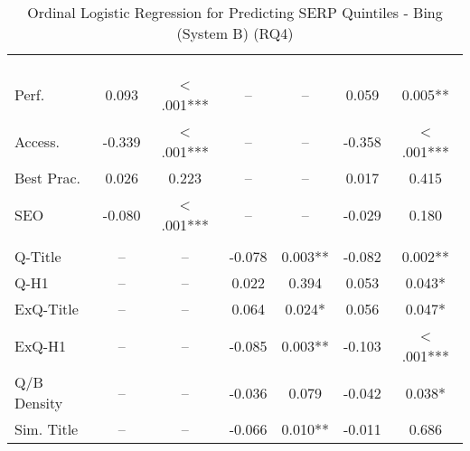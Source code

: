 \begin{table}[htbp!] 
\centering
\caption{Ordinal Logistic Regression for Predicting SERP Quintiles - Bing (System B) (RQ4)}
\label{app:rq4_regression_bing}
\small 
\setlength{\tabcolsep}{3pt}
\renewcommand{\arraystretch}{1}
\begin{threeparttable}
\begin{tabular*}{\textwidth}{l@{\extracolsep{\fill}} S[table-format=-1.3,table-space-text-post={***}] S[table-format=1.3,table-comparator=true,table-space-text-post={***}] S[table-format=-1.3,table-space-text-post={***}] S[table-format=1.3,table-comparator=true,table-space-text-post={***}] S[table-format=-1.3,table-space-text-post={***}] S[table-format=1.3,table-comparator=true,table-space-text-post={***}]}
\toprule
&  &  &  \\
\cmidrule(lr){2-3} \cmidrule(lr){4-5} \cmidrule(lr){6-7}
 & {} & {} & {} & {} & {} & {} \\
\dmidrule
{} & & & & & & \\
Perf. & 0.093 & < .001*** &  &  & 0.059 & 0.005** \\
Access. & -0.339 & < .001*** &  &  & -0.358 & < .001*** \\
Best Prac. & 0.026 & 0.223 &  &  & 0.017 & 0.415 \\
SEO & -0.080 & < .001*** &  &  & -0.029 & 0.180 \\
\midrule
{} & & & & & & \\
Q-Title &  &  & -0.078 & 0.003** & -0.082 & 0.002** \\
Q-H1 &  &  & 0.022 & 0.394 & 0.053 & 0.043* \\
ExQ-Title &  &  & 0.064 & 0.024* & 0.056 & 0.047* \\
ExQ-H1 &  &  & -0.085 & 0.003** & -0.103 & < .001*** \\
Q/B Density &  &  & -0.036 & 0.079 & -0.042 & 0.038* \\
Sim. Title &  &  & -0.066 & 0.010** & -0.011 & 0.686 \\

\end{tabular*}
\end{threeparttable}
\end{table}
